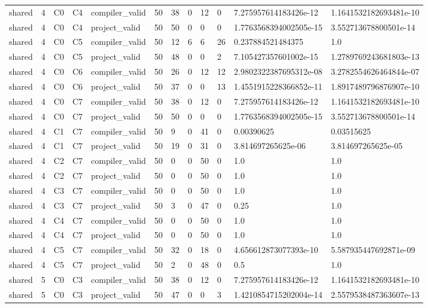 \begin{tabular}{llllllllllll}
shared & 4 & C0 & C4 & compiler\_valid & 50 & 38 & 0 & 12 & 0 & 7.275957614183426e-12 & 1.1641532182693481e-10 \\
shared & 4 & C0 & C4 & project\_valid & 50 & 50 & 0 & 0 & 0 & 1.7763568394002505e-15 & 3.552713678800501e-14 \\
shared & 4 & C0 & C5 & compiler\_valid & 50 & 12 & 6 & 6 & 26 & 0.237884521484375 & 1.0 \\
shared & 4 & C0 & C5 & project\_valid & 50 & 48 & 0 & 0 & 2 & 7.105427357601002e-15 & 1.2789769243681803e-13 \\
shared & 4 & C0 & C6 & compiler\_valid & 50 & 26 & 0 & 12 & 12 & 2.9802322387695312e-08 & 3.2782554626464844e-07 \\
shared & 4 & C0 & C6 & project\_valid & 50 & 37 & 0 & 0 & 13 & 1.4551915228366852e-11 & 1.8917489796876907e-10 \\
shared & 4 & C0 & C7 & compiler\_valid & 50 & 38 & 0 & 12 & 0 & 7.275957614183426e-12 & 1.1641532182693481e-10 \\
shared & 4 & C0 & C7 & project\_valid & 50 & 50 & 0 & 0 & 0 & 1.7763568394002505e-15 & 3.552713678800501e-14 \\
shared & 4 & C1 & C7 & compiler\_valid & 50 & 9 & 0 & 41 & 0 & 0.00390625 & 0.03515625 \\
shared & 4 & C1 & C7 & project\_valid & 50 & 19 & 0 & 31 & 0 & 3.814697265625e-06 & 3.814697265625e-05 \\
shared & 4 & C2 & C7 & compiler\_valid & 50 & 0 & 0 & 50 & 0 & 1.0 & 1.0 \\
shared & 4 & C2 & C7 & project\_valid & 50 & 0 & 0 & 50 & 0 & 1.0 & 1.0 \\
shared & 4 & C3 & C7 & compiler\_valid & 50 & 0 & 0 & 50 & 0 & 1.0 & 1.0 \\
shared & 4 & C3 & C7 & project\_valid & 50 & 3 & 0 & 47 & 0 & 0.25 & 1.0 \\
shared & 4 & C4 & C7 & compiler\_valid & 50 & 0 & 0 & 50 & 0 & 1.0 & 1.0 \\
shared & 4 & C4 & C7 & project\_valid & 50 & 0 & 0 & 50 & 0 & 1.0 & 1.0 \\
shared & 4 & C5 & C7 & compiler\_valid & 50 & 32 & 0 & 18 & 0 & 4.656612873077393e-10 & 5.587935447692871e-09 \\
shared & 4 & C5 & C7 & project\_valid & 50 & 2 & 0 & 48 & 0 & 0.5 & 1.0 \\
shared & 5 & C0 & C3 & compiler\_valid & 50 & 38 & 0 & 12 & 0 & 7.275957614183426e-12 & 1.1641532182693481e-10 \\
shared & 5 & C0 & C3 & project\_valid & 50 & 47 & 0 & 0 & 3 & 1.4210854715202004e-14 & 2.5579538487363607e-13 \\

\end{tabular}
